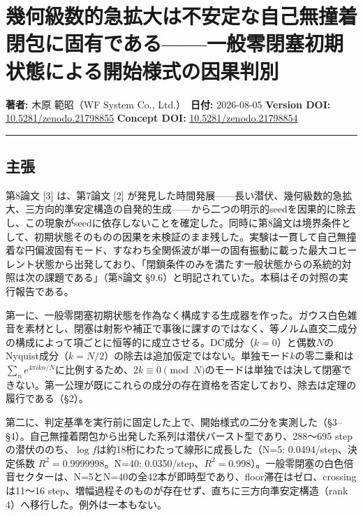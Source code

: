 \documentclass[
  a4paper,
]{ltjsarticle}
\author{}
\date{}
\begin{document}
\section{幾何級数的急拡大は不安定な自己無撞着閉包に固有である------一般零閉塞初期状態による開始様式の因果判別}\label{ux5e7eux4f55ux7d1aux6570ux7684ux6025ux62e1ux5927ux306fux4e0dux5b89ux5b9aux306aux81eaux5df1ux7121ux649eux7740ux9589ux5305ux306bux56faux6709ux3067ux3042ux308bux4e00ux822cux96f6ux9589ux585eux521dux671fux72b6ux614bux306bux3088ux308bux958bux59cbux69d8ux5f0fux306eux56e0ux679cux5224ux5225}

\textbf{著者:} 木原 範昭（WF System Co., Ltd.）　\textbf{日付:}
2026-08-05 \textbf{Version DOI:}
\href{https://doi.org/10.5281/zenodo.21798855}{10.5281/zenodo.21798855}
\textbf{Concept DOI:}
\href{https://doi.org/10.5281/zenodo.21798854}{10.5281/zenodo.21798854}

\begin{center}\rule{0.5\linewidth}{0.5pt}\end{center}

\subsection{主張}\label{ux4e3bux5f35}

第8論文 {[}3{]} は、第7論文 {[}2{]}
が発見した時間発展------長い潜伏、幾何級数的急拡大、三方向的準安定構造の自発的生成------から二つの明示的seedを因果的に除去し、この現象がseedに依存しないことを確定した。同時に第8論文は境界条件として、初期状態そのものの因果を未検証のまま残した。実験は一貫して自己無撞着な円偏波固有モード、すなわち全関係波が単一の固有振動に載った最大コヒーレント状態から出発しており、「閉鎖条件のみを満たす一般状態からの系統的対照は次の課題である」（第8論文
§9.6）と明記されていた。本稿はその対照の実行報告である。

第一に、一般零閉塞初期状態を作為なく構成する生成器を作った。ガウス白色雑音を素材とし、閉塞は射影や補正で事後に課すのではなく、等ノルム直交二成分の構成によって項ごとに恒等的に成立させる。DC成分（\(k=0\)）と偶数\(N\)のNyquist成分（\(k=N/2\)）の除去は追加仮定ではない。単独モード\(k\)の零二乗和は\(\sum_n e^{4\pi ikn/N}\)に比例するため、\(2k\equiv 0 \pmod N\)のモードは単独では決して閉塞できない。第一公理が既にこれらの成分の存在資格を否定しており、除去は定理の履行である（§2）。

第二に、判定基準を実行前に固定した上で、開始様式の二分を実測した（§3--§4）。自己無撞着閉包から出発した系列は潜伏バースト型であり、288〜695
stepの潜伏ののち、\(\log f\)は約18桁にわたって線形に成長した（N=5:
0.0494/step、決定係数 \(R^2=0.9999998\)。N=40:
0.0350/step、\(R^2=0.998\)）。一般零閉塞の白色倍音セクターは、N=5とN=40の全42本が即時型であり、floor滞在はゼロ、crossingは11〜16
step、増幅過程そのものが存在せず、直ちに三方向準安定構造（rank
4）へ移行した。例外は一本もない。
\end{document}
